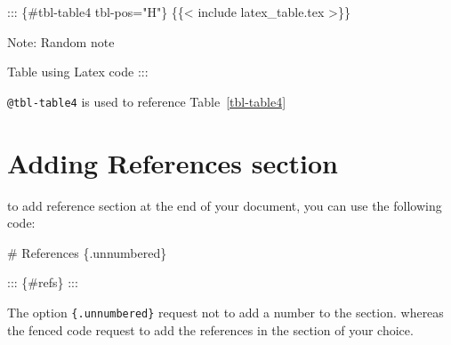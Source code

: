 \documentclass[
  12pt,
]{article}
\newenvironment{Shaded}{\begin{snugshade}}{\end{snugshade}}
\newcommand{\FunctionTok}[1]{\textcolor[rgb]{0.28,0.35,0.67}{#1}}
\newcommand{\NormalTok}[1]{\textcolor[rgb]{0.00,0.23,0.31}{#1}}
\begin{document}
\begin{Shaded}
\begin{Highlighting}[]
\NormalTok{::: \{\#tbl{-}table4 tbl{-}pos="H"\}}
\NormalTok{\{\{\textless{} include latex\_table.tex \textgreater{}\}\} }

\NormalTok{Note: Random note}

\NormalTok{Table using Latex code}
\NormalTok{:::}
\end{Highlighting}
\end{Shaded}

\begin{table}[H]

\caption{\label{tbl-table4}Table using Latex code}


\end{table}%

\texttt{@tbl-table4} is used to reference Table~\ref{tbl-table4}

\section{Adding References section}\label{adding-references-section}

to add reference section at the end of your document, you can use the
following code:

\begin{Shaded}
\begin{Highlighting}[]
\FunctionTok{\# References \{.unnumbered\}}

\NormalTok{::: \{\#refs\}}
\NormalTok{:::}
\end{Highlighting}
\end{Shaded}

The option \texttt{\{.unnumbered\}} request not to add a number to the
section. whereas the fenced code request to add the references in the
section of your choice.
\end{document}

